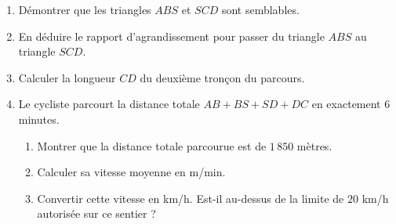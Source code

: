 \documentclass[11pt,a4paper]{article}
\begin{document}
    
    
    \begin{enumerate}
        \item Démontrer que les triangles $ABS$ et $SCD$ sont semblables.
        \item En déduire le rapport d'agrandissement pour passer du triangle $ABS$ au triangle $SCD$.
        \item Calculer la longueur $CD$ du deuxième tronçon du parcours.
        \item Le cycliste parcourt la distance totale $AB + BS + SD + DC$ en exactement 6 minutes.
        \begin{enumerate}
            \item Montrer que la distance totale parcourue est de $1\,850$ mètres.
            \item Calculer sa vitesse moyenne en m/min.
            \item Convertir cette vitesse en km/h. Est-il au-dessus de la limite de $20$ km/h autorisée sur ce sentier ?
        \end{enumerate}
    \end{enumerate}
    
\end{document}
